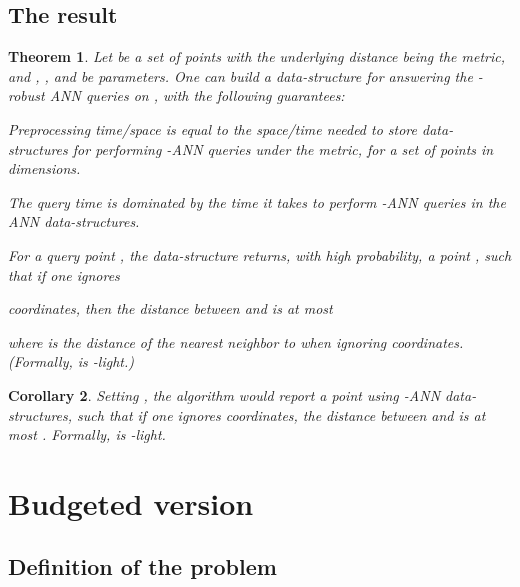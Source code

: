\documentclass[12pt]{article}\usepackage[cm]{fullpage}
\newcommand{\Term}[1]{\textsf{#1}}
\newtheorem{theorem}{Theorem}[subsection]\newtheorem{lemma}[theorem]{Lemma}\newtheorem{claim}[theorem]{Claim}\newtheorem*{restate*}[theorem]{Restatement of }\newtheorem{corollary}[theorem]{Corollary}
\theoremstyle{remark}\theoremheaderfont{\sf}\theorembodyfont{\upshape}\newtheorem{defn}[theorem]{Definition}
\numberwithin{figure}{section}\numberwithin{table}{section}\numberwithin{equation}{section}
\newcommand{\HLink}[2]{\hyperref[#2]{#1~\ref*{#2}}}
\newcommand{\HLinkPage}[2]{\hyperref[#2]{#1~\ref*{#2}}}
\newcommand{\seclab}[1]{\label{sec:#1}} \newcommand{\secref}[1]{\HLink{Section}{sec:#1}} \newcommand{\secrefpage}[1]{\HLinkPage{Section}{sec:#1}}
\newcommand{\thmlab}[1]{{\label{theo:#1}}}
\newcommand{\ANN}{\Term{ANN}\xspace}\newcommand{\NN}{\Term{NN}\xspace}
\begin{document}
\subsection{The result}

\begin{theorem}
    \thmlab{l:p}
Let  be a set of  points with the
    underlying distance being the  metric, and ,
    , and  be parameters.  One
    can build a data-structure for answering the -robust \ANN
    queries on , with the following guarantees:
    \begin{compactenum}[\,\,(A)]
        \item Preprocessing time/space is equal to the space/time
        needed to store 
        data-structures for performing -\ANN queries
        under the  metric, for a set of  points in
         dimensions.


        \item The query time is dominated by the time it takes to
        perform -\ANN queries in the  \ANN
        data-structures.

        \item For a query point , the data-structure returns,
        with high probability, a point , such that
        if one ignores 
        
        coordinates, then the  distance between  and
         is at most
        
        where  is the distance of the nearest neighbor to
         when ignoring  coordinates.  (Formally,
         is
        -light.)
    \end{compactenum}
\end{theorem}

\begin{corollary}
    Setting , the algorithm would report a point 
    using -\ANN data-structures, such that if one ignores
     coordinates, the  distance between 
    and  is at most .
    Formally,  is
    -light.
\end{corollary}





\section{Budgeted version}
\seclab{sec:budgeted}
\subsection{Definition of the problem}
\end{document}
